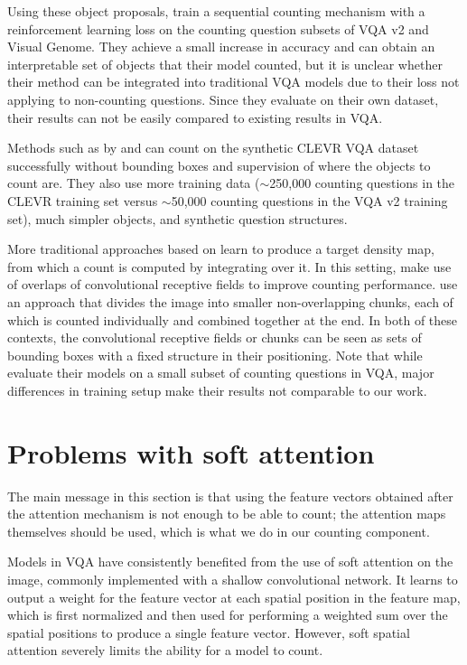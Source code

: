 \documentclass[letterpaper]{article}
\begin{document}
Using these object proposals, \citet{Trott2018a} train a sequential counting mechanism with a reinforcement learning loss on the counting question subsets of VQA v2 and Visual Genome.
They achieve a small increase in accuracy and can obtain an interpretable set of objects that their model counted, but it is unclear whether their method can be integrated into traditional VQA models due to their loss not applying to non-counting questions.
Since they evaluate on their own dataset, their results can not be easily compared to existing results in VQA.

Methods such as by \citet{Santoro2017a} and \citet{Perez2017a} can count on the synthetic CLEVR VQA dataset \citep{Johnson2017a} successfully without bounding boxes and supervision of where the objects to count are.
They also use more training data ($\sim$250,000 counting questions in the CLEVR training set versus $\sim$50,000 counting questions in the VQA v2 training set), much simpler objects, and synthetic question structures.

More traditional approaches based on \citet{Lempitsky2010a} learn to produce a target density map, from which a count is computed by integrating over it.
In this setting, \citet{Cohen2017a} make use of overlaps of convolutional receptive fields to improve counting performance.
\citet{Chattopadhyay2017a} use an approach that divides the image into smaller non-overlapping chunks, each of which is counted individually and combined together at the end.
In both of these contexts, the convolutional receptive fields or chunks can be seen as sets of bounding boxes with a fixed structure in their positioning.
Note that while \citet{Chattopadhyay2017a} evaluate their models on a small subset of counting questions in VQA, major differences in training setup make their results not comparable to our work.


\section{Problems with soft attention}\label{sec:problems}
The main message in this section is that using the feature vectors obtained after the attention mechanism is not enough to be able to count;
the attention maps themselves should be used, which is what we do in our counting component.

Models in VQA have consistently benefited from the use of soft attention \citep{Mnih2014a, Bahdanau2014a} on the image, commonly implemented with a shallow convolutional network.
It learns to output a weight for the feature vector at each spatial position in the feature map, which is first normalized and then used for performing a weighted sum over the spatial positions to produce a single feature vector.
However, soft spatial attention severely limits the ability for a model to count.
\end{document}

